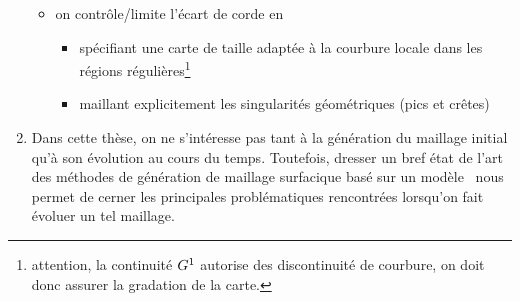 \begin{enumerate}
\begin{itemize}[label=$\rightarrow$]
        \item on contrôle/limite l'écart de corde en
        \begin{itemize}
            \item spécifiant une carte de taille adaptée à la courbure locale dans les régions régulières\footnote{attention, la continuité $G^{1}$ autorise des discontinuité de courbure, on doit donc assurer la gradation de la carte.}
            \item \label{item:discretisation_singularites} maillant explicitement les singularités géométriques (pics et crêtes)
        \end{itemize}
    \end{itemize}
    
    \item Dans cette thèse, on ne s'intéresse pas tant à la génération du maillage initial %
    qu'à son évolution au cours du temps. 
	Toutefois, dresser un bref état de l'art des méthodes de génération de maillage surfacique basé sur un modèle \brep\ nous permet de cerner les principales problématiques rencontrées lorsqu'on fait évoluer un tel maillage.
\end{enumerate}


